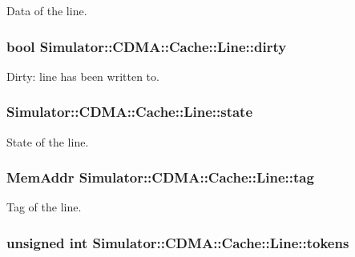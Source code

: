 Data of the line. 

\hypertarget{struct_simulator_1_1_c_d_m_a_1_1_cache_1_1_line_aab45844e3f59e09ead680535185949f7}{
\subsubsection[{dirty}]{\setlength{\rightskip}{0pt plus 5cm}bool Simulator\+::\+C\+D\+M\+A\+::\+Cache\+::\+Line\+::dirty}}\label{struct_simulator_1_1_c_d_m_a_1_1_cache_1_1_line_aab45844e3f59e09ead680535185949f7}


Dirty\+: line has been written to. 

\hypertarget{struct_simulator_1_1_c_d_m_a_1_1_cache_1_1_line_af60d88ab961b6019c76cd66ef0b6c23a}{
\subsubsection[{state}]{ Simulator\+::\+C\+D\+M\+A\+::\+Cache\+::\+Line\+::state}}\label{struct_simulator_1_1_c_d_m_a_1_1_cache_1_1_line_af60d88ab961b6019c76cd66ef0b6c23a}


State of the line. 

\hypertarget{struct_simulator_1_1_c_d_m_a_1_1_cache_1_1_line_a6c21618c9cdde8b05c0bb29d79b85575}{
\subsubsection[{tag}]{\setlength{\rightskip}{0pt plus 5cm}Mem\+Addr Simulator\+::\+C\+D\+M\+A\+::\+Cache\+::\+Line\+::tag}}\label{struct_simulator_1_1_c_d_m_a_1_1_cache_1_1_line_a6c21618c9cdde8b05c0bb29d79b85575}


Tag of the line. 

\hypertarget{struct_simulator_1_1_c_d_m_a_1_1_cache_1_1_line_a3b8c12dfbaee09b77c1cf58c75fc475c}{
\subsubsection[{tokens}]{\setlength{\rightskip}{0pt plus 5cm}unsigned int Simulator\+::\+C\+D\+M\+A\+::\+Cache\+::\+Line\+::tokens}}\label{struct_simulator_1_1_c_d_m_a_1_1_cache_1_1_line_a3b8c12dfbaee09b77c1cf58c75fc475c}


